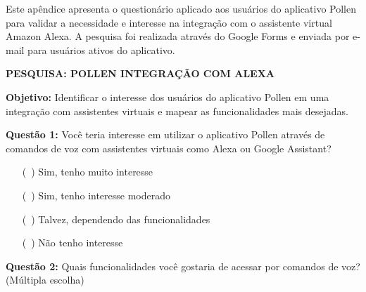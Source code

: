 \makeatletter
{}
\makeatother

\renewcommand{\baselinestretch}{1.5}\selectfont
\setlength{\parskip}{0pt}

\label{apendice:questionario}

Este apêndice apresenta o questionário aplicado aos usuários do aplicativo Pollen para validar a necessidade e interesse na integração com o assistente virtual Amazon Alexa. A pesquisa foi realizada através do Google Forms e enviada por e-mail para usuários ativos do aplicativo.

\vspace{1em}

\textbf{PESQUISA: POLLEN INTEGRAÇÃO COM ALEXA}

\vspace{0.5em}

\textbf{Objetivo:} Identificar o interesse dos usuários do aplicativo Pollen em uma integração com assistentes virtuais e mapear as funcionalidades mais desejadas.

\vspace{1em}

\textbf{Questão 1:} Você teria interesse em utilizar o aplicativo Pollen através de comandos de voz com assistentes virtuais como Alexa ou Google Assistant?

\begin{itemize}
    \item[($\,\,\,$)] Sim, tenho muito interesse
    \item[($\,\,\,$)] Sim, tenho interesse moderado
    \item[($\,\,\,$)] Talvez, dependendo das funcionalidades
    \item[($\,\,\,$)] Não tenho interesse
\end{itemize}

\vspace{1em}

\textbf{Questão 2:} Quais funcionalidades você gostaria de acessar por comandos de voz? (Múltipla escolha)


